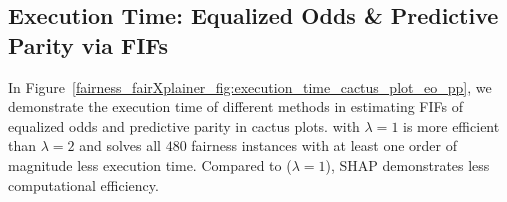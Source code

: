 \subsection{Execution Time: Equalized Odds \& Predictive Parity via FIFs}
In Figure~\ref{fairness_fairXplainer_fig:execution_time_cactus_plot_eo_pp}, we demonstrate the execution time of different methods in estimating FIFs of equalized odds and predictive parity in cactus plots. {\fairXplainer} with $ \lambda = 1 $ is more efficient than $ \lambda = 2 $ and solves all $ 480 $ fairness instances with at least one order of magnitude less execution time. Compared to {\fairXplainer} ($ \lambda = 1 $), SHAP demonstrates less computational efficiency.

\begin{figure}
	\centering

\end{figure}
